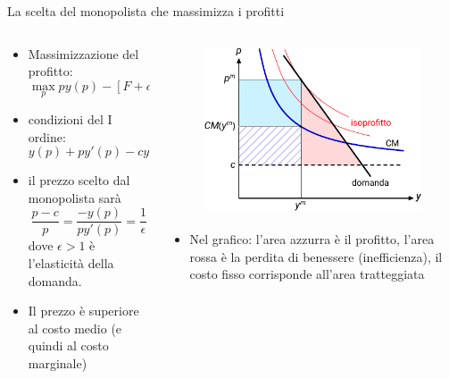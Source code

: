 \documentclass[aspectratio=149,11pt]{beamer}
\begin{document}
\begin{frame}{La scelta del monopolista che massimizza i profitti}
\begin{columns}
\begin{column}{.45\columnwidth}
\begin{itemize}
\item Massimizzazione del profitto:
\begin{equation*}
\max_{p} py(p)-[F+cy(p)]
\end{equation*}
\item condizioni del I ordine:
\begin{equation*}
y(p) + py'(p) - cy'(p)=0
\end{equation*}
\item il prezzo scelto dal monopolista sarà
\begin{equation*}
\frac{p-c}{p}=\frac{-y(p)}{py'(p)}=\frac{1}{\epsilon}
\end{equation*}
dove $\epsilon>1$ è l'elasticità della domanda.
\item Il prezzo è superiore al costo medio (e quindi al
costo marginale)
\end{itemize}
\end{column}

\begin{column}{.55\columnwidth}
\begin{figure}[htbp]
\centering
\includegraphics[height=5cm]{./figure/monopolio-naturale-2-color.pdf}
\end{figure}

\begin{itemize}
\item Nel grafico: l'area azzurra è il profitto, l'area rossa è la perdita di benessere (inefficienza), il costo fisso corrisponde all'area tratteggiata
\end{itemize}
\end{column}
\end{columns}
\end{frame}
\end{document}
